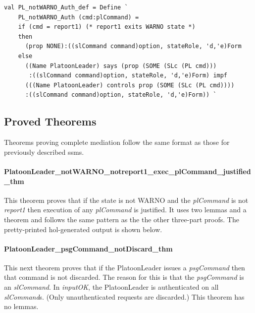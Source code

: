 \documentclass[../../main/main.tex]{subfiles}
\begin{document}
\begin{lstlisting}
val PL_notWARNO_Auth_def = Define `
    PL_notWARNO_Auth (cmd:plCommand) =
    if (cmd = report1) (* report1 exits WARNO state *)
    then
      (prop NONE):((slCommand command)option, stateRole, 'd,'e)Form
    else
      ((Name PlatoonLeader) says (prop (SOME (SLc (PL cmd)))
       :((slCommand command)option, stateRole, 'd,'e)Form) impf
      (((Name PlatoonLeader) controls prop (SOME (SLc (PL cmd))))
      :((slCommand command)option, stateRole, 'd,'e)Form)) `
\end{lstlisting}

\subsection{Proved Theorems}
Theorems proving complete mediation follow the same format as those for previously described \glspl{ssm}.

\paragraph*{PlatoonLeader_notWARNO_notreport1_exec_plCommand_justified_thm}
This theorem proves that if the state is not WARNO and the \textit{plCommand} is not \textit{report1} then execution of any \textit{plCommand} is justified.  It uses two lemmas and a theorem and follows the same pattern as the the other three-part proofs.  The pretty-printed \gls{hol}-generated output is shown below.

\HOLssmPlanPBTheoremsPlatoonLeaderXXnotWARNOXXnotreportOneXXexecXXplCommandXXlemma

\HOLssmPlanPBTheoremsPlatoonLeaderXXnotWARNOXXnotreportOneXXexecXXplCommandXXjustifiedXXlemma

\HOLssmPlanPBTheoremsPlatoonLeaderXXnotWARNOXXnotreportOneXXexecXXplCommandXXjustifiedXXthm

\paragraph*{PlatoonLeader_psgCommand_notDiscard_thm}
This next theorem proves that if the PlatoonLeader issues a \textit{psgCommand} then that command is not discarded.  The reason for this is that the \textit{psgCommand} is an \textit{slCommand}.  In \textit{inputOK}, the PlatoonLeader is authenticated on all \textit{slCommand}s.  (Only unauthenticated requests are discarded.)  This theorem has no lemmas.
\end{document}
